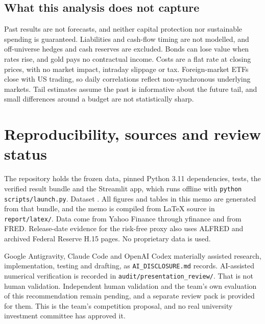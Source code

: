 \documentclass[11pt,a4paper]{article}
\begin{document}
\begin{table}[htb]\centering\caption{Proposed monitoring triggers. Thresholds are team proposals for committee approval.}\label{tab:monitoring}\small\end{table}

\subsection{What this analysis does not capture}
Past results are not forecasts, and neither capital protection nor sustainable spending is guaranteed. Liabilities and cash-flow timing are not modelled, and off-universe hedges and cash reserves are excluded. Bonds can lose value when rates rise, and gold pays no contractual income. Costs are a flat rate at closing prices, with no market impact, intraday slippage or tax. Foreign-market ETFs close with US trading, so daily correlations reflect non-synchronous underlying markets. Tail estimates assume the past is informative about the future tail, and small differences around a budget are not statistically sharp.

\section{Reproducibility, sources and review status}
The repository holds the frozen data, pinned Python 3.11 dependencies, tests, the verified result bundle \qeBundle{} and the Streamlit app, which runs offline with \texttt{python scripts/launch.py}. Dataset \texttt{\qeDataset}. All figures and tables in this memo are generated from that bundle, and the memo is compiled from LaTeX source in \texttt{report/latex/}. Data come from Yahoo Finance through yfinance and from FRED. Release-date evidence for the risk-free proxy also uses ALFRED and archived Federal Reserve H.15 pages. No proprietary data is used.

Google Antigravity, Claude Code and OpenAI Codex materially assisted research, implementation, testing and drafting, as \texttt{AI\_DISCLOSURE.md} records. AI-assisted numerical verification is recorded in \texttt{audit/presentation\_review/}. That is not human validation. Independent human validation and the team's own evaluation of this recommendation remain pending, and a separate review pack is provided for them. This is the team's competition proposal, and no real university investment committee has approved it.



\end{document}
